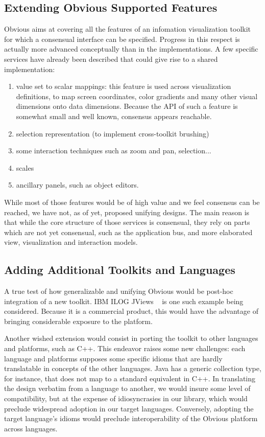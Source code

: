 
\subsection{Extending Obvious Supported Features}

Obvious aims at covering all the features of an infomation
visualization toolkit for which a consensual interface can be
specified.  Progress in this respect is actually more advanced
conceptually than in the implementations.  A few specific services
have already been described that could give rise to a shared
implementation:

\begin{enumerate}
\item value set to scalar mappings: this feature is used across
  visualization definitions, to map screen coordinates, color
  gradients and many other visual dimensions onto data
  dimensions. Because the API of such a feature is somewhat small and
  well known, consensus appears reachable.
\item selection representation (to implement cross-toolkit brushing)
\item some interaction techniques such as zoom and pan, selection...
\item scales
\item ancillary panels, such as object editors.
\end{enumerate}

While most of those features would be of high value and we feel consensus can be reached, we have not, as of yet, proposed unifying designs. The main reason is that while the core structure of those services is consensual, they rely on parts which are not yet consensual, such as the application bus, and more elaborated view, visualization and interaction models.

\subsection{Adding Additional Toolkits and Languages}

A true test of how generalizable and unifying Obvious would be
post-hoc integration of a new toolkit. IBM ILOG JViews ~\cite{JViews} is
one such example being considered. Because it is a commercial product, this would 
have the advantage of bringing considerable exposure to the platform. 

Another wished extension would consist in porting the toolkit to other
languages and platforms, such as C++. This endeavor raises some new
challenges: each language and platforms supposes some specific idioms
that are hardly translatable in concepts of the other languages. Java
has a generic collection type, for instance, that does not map to a
standard equivalent in C++. In translating the design verbatim from a
language to another, we would insure some level of compatibility, but
at the expense of idiosyncrasies in our library, which would preclude
widespread adoption in our target languages. Conversely, adopting the
target language's idioms would preclude interoperability of the
Obvious platform across languages.


